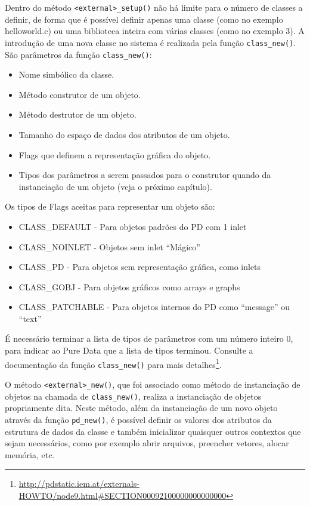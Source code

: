 Dentro do método \texttt{<external>\_setup()} não há limite para o número de
classes a definir, de forma que é possível definir apenas uma classe (como no
exemplo helloworld.c) ou uma biblioteca inteira com várias classes (como no exemplo 3).
A introdução de uma nova classe no sistema é realizada pela função
\texttt{class\_new()}.
São parâmetros da função \texttt{class\_new()}:

\begin{itemize}
\item Nome simbólico da classe.
\item Método construtor de um objeto.
\item Método destrutor de um objeto.
\item Tamanho do espaço de dados dos atributos de um objeto.
\item Flags que definem a representação gráfica do objeto.
\item Tipos dos parâmetros a serem passados para o construtor quando da
      instanciação de um objeto (veja o próximo capítulo).
\end{itemize}

Os tipos de Flags aceitas para representar um objeto são:
\begin{itemize}
   \item CLASS\_DEFAULT - Para objetos padrões do PD com 1 inlet
   \item CLASS\_NOINLET - Objetos sem inlet ``Mágico''
   \item CLASS\_PD - Para objetos sem representação gráfica, como inlets
   \item CLASS\_GOBJ - Para objetos gráficos como arrays e graphs
   \item CLASS\_PATCHABLE - Para objetos internos do PD como ``message'' ou ``text''
\end{itemize}

É necessário terminar a lista de tipos de parâmetros com um número inteiro 0,
para indicar ao Pure Data que a lista de tipos terminou.
Consulte a documentação da função \texttt{class\_new()} para mais
detalhes\footnote{\url{http://pdstatic.iem.at/externals-HOWTO/node9.html\#SECTION00092100000000000000}}.

O método \texttt{<external>\_new()}, que foi associado como método de
instanciação de objetos na chamada de \texttt{class\_new()}, realiza a
instanciação de objetos propriamente dita.
Neste método, além da instanciação de um novo objeto através da função
\texttt{pd\_new()}, é possível definir os
valores dos atributos da estrutura de dados da classe e também inicializar
quaisquer outros contextos que sejam necessários, como por exemplo abrir
arquivos, preencher vetores, alocar memória, etc.

